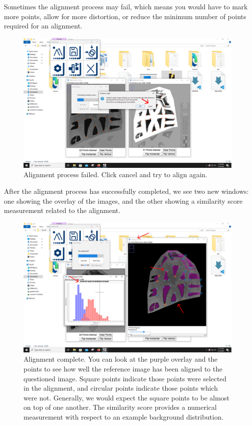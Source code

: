 \documentclass{csafedoc}
\begin{document}
Sometimes the alignment process may fail, which means you would have to mark more points,
allow for more distortion, or reduce the minimum number of points required for an
alignment.

\begin{figure}[H]
	\begin{center}
		\includegraphics[width=0.8\linewidth]{images/step_8b_fail-anno.png}
	\end{center}
	\caption{Alignment process failed. Click cancel and try to align again.}
	\label{fig:step8b_fail}
\end{figure}

After the alignment process has successfully completed, we see two new windows: one
showing the overlay of the images, and the other showing a similarity score measurement
related to the alignment.

\begin{figure}[H]
	\begin{center}
		\includegraphics[width=0.8\linewidth]{images/step_8c-anno.png}
	\end{center}
	\caption{Alignment complete. You can look at the purple overlay and the points to see how well the reference image has been aligned to the questioned image. Square points indicate those points were selected in the alignment, and circular points indicate those points which were not. Generally, we would expect the square points to be almost on top of one another. The similarity score provides a numerical measurement with respect to an example background distribution.}
	\label{fig:step8c}
\end{figure}
\end{document}
